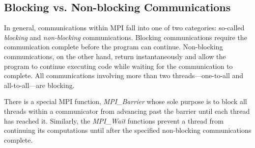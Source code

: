 \subsection{Blocking vs. Non-blocking Communications}

In general, communications within MPI fall into one of two categories: so-called
\emph{blocking} and \emph{non-blocking} communications. Blocking communications
require the communication complete before the program can continue. Non-blocking
communications, on the other hand, return instantaneously and allow the program
to continue executing code while waiting for the communication to complete. All
communications involving more than two threads---\ie one-to-all and
all-to-all---are blocking.

There is a special MPI function, \emph{MPI\_Barrier} whose sole purpose is to
block all threads within a communicator from advancing past the barrier until
each thread has reached it. Similarly, the \emph{MPI\_Wait} functions prevent a
thread from continuing its computations until after the specified non-blocking
communications complete.

